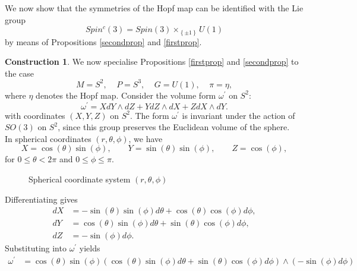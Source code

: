 \documentclass{article}
\theoremstyle{plain}
\theoremstyle{definition}
\newtheorem{const}[thm]{Construction}
\begin{document}
We now show that the symmetries of the Hopf map can be identified with the Lie group
\[
Spin^c(3) = Spin(3) \times_{\left\{\pm 1\right\}} U(1)
\]
by means of Propositions \ref{secondprop} and \ref{firstprop}.
\begin{const}\label{symmofhopf} We now specialise Propositions \ref{firstprop} and \ref{secondprop} to the case
$$M = S^2, ~~~~~ P = S^3, ~~~~~ G = U(1), ~~~~~ \pi = \eta,$$
where $\eta$ denotes the Hopf map.
Consider the volume form $\omega^\prime$ on $S^2$:
\begin{equation}
\omega^\prime = X dY \wedge dZ + Y dZ \wedge dX + Z dX \wedge dY.
\end{equation}
with coordinates $(X,Y,Z)$ on $S^2$. The form $\omega^\prime$ is invariant under the action of $SO(3)$ on $S^2$, since this group preserves the Euclidean volume of the sphere. \\
In spherical coordinates $(r,\theta,\phi)$, we have
\[
X = \cos(\theta) \sin(\phi), \qquad
Y = \sin(\theta) \sin(\phi), \qquad
Z = \cos(\phi),
\]
for $0 \leq \theta < 2\pi$ and $0 \leq \phi \leq \pi$.
\begin{figure}[H]
\centering
{}
\caption{Spherical coordinate system $(r,\theta,\phi)$}
\end{figure}
\noindent
Differentiating gives
\begin{align*}
dX & = -\sin(\theta) \sin(\phi) d\theta + \cos(\theta) \cos(\phi) d\phi, \\
dY & = \cos(\theta) \sin(\phi) d\theta + \sin(\theta) \cos(\phi) d\phi, \\
dZ & = -\sin(\phi) d\phi.
\end{align*}
Substituting into $\omega^\prime$ yields
\begin{align*}
\omega^\prime & = \cos(\theta) \sin(\phi)\left(\cos(\theta) \sin(\phi) d\theta + \sin(\theta) \cos(\phi) d\phi\right) \wedge \left(-\sin(\phi) d\phi\right) \\

\end{align*}
\end{const}
\end{document}
